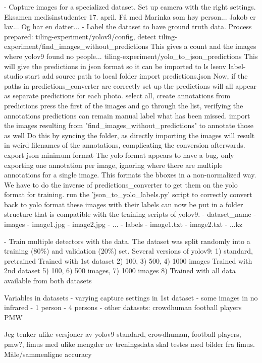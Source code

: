 - Capture images for a specialized dataset.
	Set up camera with the right settings.
	Eksamen medisinstudenter 17. april.
		Få med Marinka som høy person...
		Jakob er lav... Og har en datter...
- Label the dataset to have ground truth data.
	Process prepared: 
		tiling-experiment/yolov9/config, detect
		tiling-experiment/find_images_without_predictions
			This gives a count and the images where yolov9 found no people...
		tiling-experiment/yolo_to_json_predictions
			This will give the predictions in json format so it can be imported to ls
		lsenv
		label-studio start
		add source path to local folder
		import predictions.json
			Now, if the paths in predictions_converter are correctly set up the predictions will all appear as separate predictions for each photo.
		select all, create annotations from predictions
		press the first of the images and go through the list, verifying the annotations
			predictions can remain
		manual label what has been missed.
		import the images resulting from "find_images_without_predictions" to annotate those as well
			Do this by syncing the folder, as directly importing the images will result in weird filenames of the annotations, complicating the conversion afterwards.
		export json minimum format
			The yolo format appears to have a bug, only exporting one annotation per image, ignoring where there are multiple annotations for a single image.
			This formats the bboxes in a non-normalized way. We have to do the inverse of predictions_converter to get them on the yolo format for training.
		run the 'json_to_yolo_labels.py' script to correctly convert back to yolo format 
		these images with their labels can now be put in a folder structure that is compatible with the training scripts of yolov9.
		- {dataset_name}
			- images
				- {image1.jpg}
				- {image2.jpg}
				- ...
			- labels
				- {image1.txt}
				- {image2.txt}
				- ...kz

- Train multiple detectors with the data.
	The dataset was split randomly into a training (80\%) and validation (20\%) set.
	Several versions of yolov9:
		1) standard, pretrained
		Trained with 1st dataset
			2) 100, 3) 500, 4) 1000 images
		Trained with 2nd dataset
			5) 100, 6) 500 images, 7) 1000 images
		8) Trained with all data available from both datasets

Variables in datasets
	- varying capture settings in 1st dataset
	- some images in no infrared
	- 1 person
	- 4 persons
	- other datasets: 
		crowdhuman 
		football players
		PMW

Jeg tenker ulike versjoner av yolov9 standard, crowdhuman, football players, pmw?, fimus
med ulike mengder av treningsdata skal testes med bilder fra fimus.
	Måle/sammenligne accuracy


